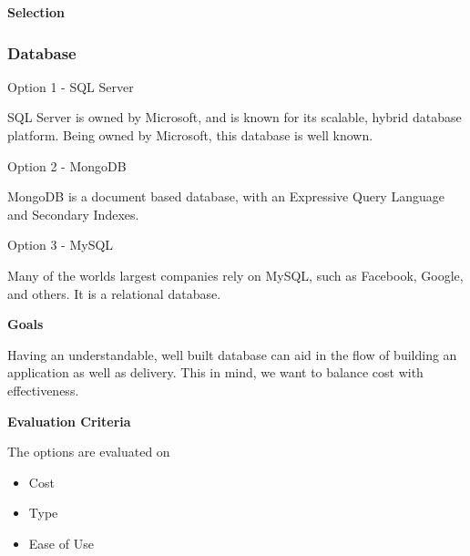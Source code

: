 \documentclass[letterpaper, 10pt, draftclsnofoot, compsoc, onecolumn]{IEEEtran}
\begin{document}
{\medskip
{\noindent\rmfamily\bfseries\color{black} Selection \par}
{\noindent \par}

\medskip

\newpage
\subsubsection{Database}
{\noindent Option 1 - SQL Server \par}
{\noindent SQL Server is owned by Microsoft, and is known for its scalable, hybrid database platform. Being owned by Microsoft, this database is well known. \cite{SQL Server} \par}

\medskip
{\noindent Option 2 - MongoDB \par}
{\noindent MongoDB is a document based database, with an Expressive Query Language and Secondary Indexes. \cite{MongoDB}  \par}

\medskip
{\noindent Option 3 - MySQL \par}
{\noindent Many of the worlds largest companies rely on MySQL, such as Facebook, Google, and others. It is a relational database. \cite{MySQL}  \par}

\medskip
{\noindent\rmfamily\bfseries\color{black} Goals \par}
{\noindent Having an understandable, well built database can aid in the flow of building an application as well as delivery. This in mind, we want to balance cost with effectiveness. \par}

\medskip
\newpage
{\noindent\rmfamily\bfseries\color{black} Evaluation Criteria \par}
{\noindent The options are evaluated on 

\begin{itemize}
\item Cost
\item Type
\item Ease of Use
\end{itemize}

 \par}


}
\end{document}

